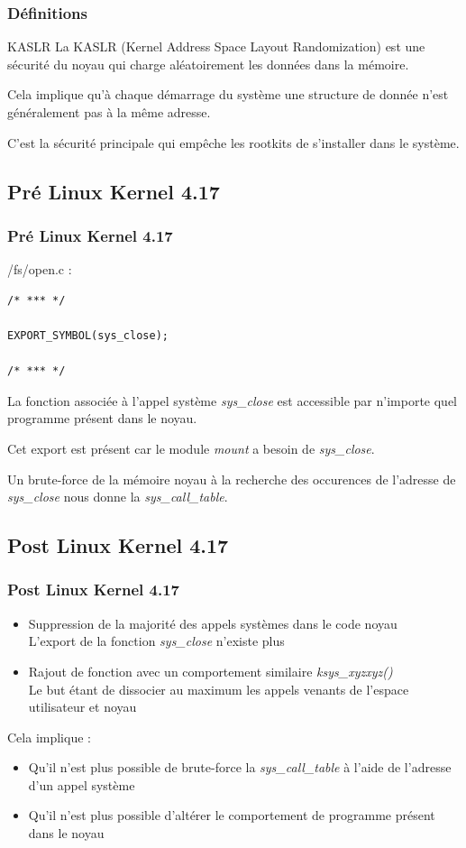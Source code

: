 \documentclass{beamer}
\begin{document}
\begin{frame}
\frametitle{Définitions}
\begin{block}{KASLR}
La KASLR (Kernel Address Space Layout Randomization) est une sécurité du noyau qui charge aléatoirement les données dans la mémoire.
\end{block}

Cela implique qu'à chaque démarrage du système une structure de donnée n'est généralement pas à la même adresse.

C'est la sécurité principale qui empêche les rootkits de s'installer dans le système.
\end{frame}

\subsection{Pré Linux Kernel 4.17}

\begin{frame}[fragile]
\frametitle{Pré Linux Kernel 4.17}
/fs/open.c :
\begin{lstlisting}[style=CStyle]
/* *** */

EXPORT_SYMBOL(sys_close);

/* *** */
\end{lstlisting}
\medskip
La fonction associée à l'appel système \textit{sys\_close} est accessible par n'importe quel programme présent dans le noyau.

Cet export est présent car le module \textit{mount} a besoin de \textit{sys\_close}.

\medskip
Un brute-force de la mémoire noyau à la recherche des occurences de l'adresse de \textit{sys\_close} nous donne la \textit{sys\_call\_table}.
\end{frame}

\subsection{Post Linux Kernel 4.17}

\begin{frame}
\frametitle{Post Linux Kernel 4.17}
\begin{itemize}
\item 	Suppression de la majorité des appels systèmes dans le code noyau\\
	L'export de la fonction \textit{sys\_close} n'existe plus\\
\item 	Rajout de fonction avec un comportement similaire \textit{ksys\_xyzxyz()}\\
	Le but étant de dissocier au maximum les appels venants de l'espace utilisateur et noyau
\end{itemize}
Cela implique :
\begin{itemize}
\item 	Qu'il n'est plus possible de brute-force la \textit{sys\_call\_table} à l'aide de l'adresse d'un appel système
\item 	Qu'il n'est plus possible d'altérer le comportement de programme présent dans le noyau
\end{itemize}
\end{frame}
\end{document}
